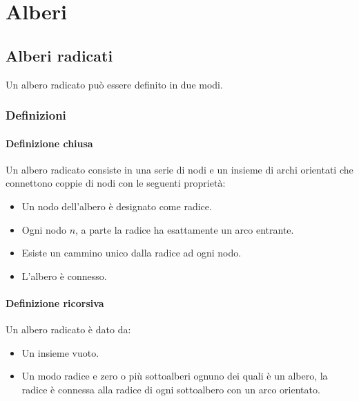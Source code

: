 \chapter{Alberi}
\section{Alberi radicati}
Un albero radicato pu\`o essere definito in due modi.
\subsection{Definizioni}
\subsubsection{Definizione chiusa}
Un albero radicato consiste in una serie di nodi e un insieme di archi orientati che connettono coppie di nodi con le seguenti propriet\`a:
\begin{itemize}
\item Un nodo dell'albero \`e designato come radice.
\item Ogni nodo $n$, a parte la radice ha esattamente un arco entrante.
\item Esiste un cammino unico dalla radice ad ogni nodo.
\item L'albero \`e connesso.
\end{itemize}
\subsubsection{Definizione ricorsiva}
Un albero radicato \`e dato da:
\begin{itemize}
\item Un insieme vuoto.
\item Un modo radice e zero o pi\`u sottoalberi ognuno dei quali \`e un albero, la radice \`e connessa alla radice di ogni sottoalbero con un arco orientato.
\end{itemize}
